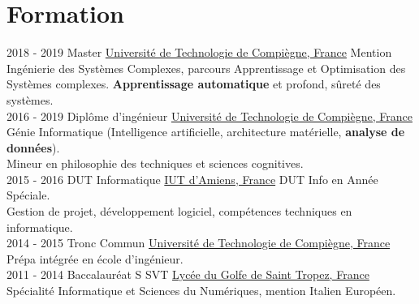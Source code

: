 \documentclass[letterpaper]{twentysecondcv} %
\begin{document}
\makeprofile %


\section{Formation}

\begin{twenty} %
	\twentyitem
    	{2018 - 2019}
        {}
        {Master}
        {\href{https://www.utc.fr/}{Université de Technologie de Compiègne, France}}
        {}
        {Mention Ingénierie des Systèmes Complexes, parcours Apprentissage et Optimisation des Systèmes complexes. \textbf{Apprentissage automatique} et profond, sûreté des systèmes.}
    \\
	\twentyitem
    	{2016 - 2019}
        {}
        {Diplôme d'ingénieur}
        {\href{https://www.utc.fr/}{Université de Technologie de Compiègne, France}}
        {}
        {Génie Informatique (Intelligence artificielle, architecture matérielle, \textbf{analyse de données}).\\Mineur en philosophie des techniques et sciences cognitives.}
    \\
	\twentyitem
    	{2015 - 2016}
        {}
        {DUT Informatique}
        {\href{http://www.iut-amiens.fr/}{IUT d'Amiens, France}}
        {}
        {DUT Info en Année Spéciale.\\Gestion de projet, développement logiciel, compétences techniques en informatique.}
    \\
	\twentyitem
    	{2014 - 2015}
        {}
        {Tronc Commun}
        {\href{https://www.utc.fr/}{Université de Technologie de Compiègne, France}}
        {}
        {Prépa intégrée en école d'ingénieur.}
    \\
	\twentyitem
    	{2011 - 2014}
		{}
        {Baccalauréat S SVT}
        {\href{http://www.lyc-du-golfe-de-saint-tropez.ac-nice.fr/}{Lycée du Golfe de Saint Tropez, France}}
        {}
        {Spécialité Informatique et Sciences du Numériques, mention Italien Européen.}
\end{twenty}

\end{document}
